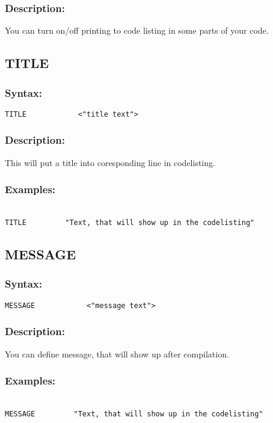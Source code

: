         \subsubsection{Description:}
        You can turn on/off printing to code listing in some parts of your code.

    \subsection{TITLE}
        \subsubsection{Syntax:}
            \verb'TITLE            <"title text">'

        \subsubsection{Description:}
        This will put a title into coresponding line in codelisting.

        \subsubsection{Examples:}
            {
                ~\\
                \usecodefont
                \verb'TITLE         "Text, that will show up in the codelisting"'
            }

    \subsection{MESSAGE}
        \subsubsection{Syntax:}
            \verb'MESSAGE            <"message text">'

        \subsubsection{Description:}
            You can define message, that will show up after compilation.

        \subsubsection{Examples:}
            {
                ~\\
                \usecodefont
                \verb'MESSAGE         "Text, that will show up in the codelisting"'
            }

